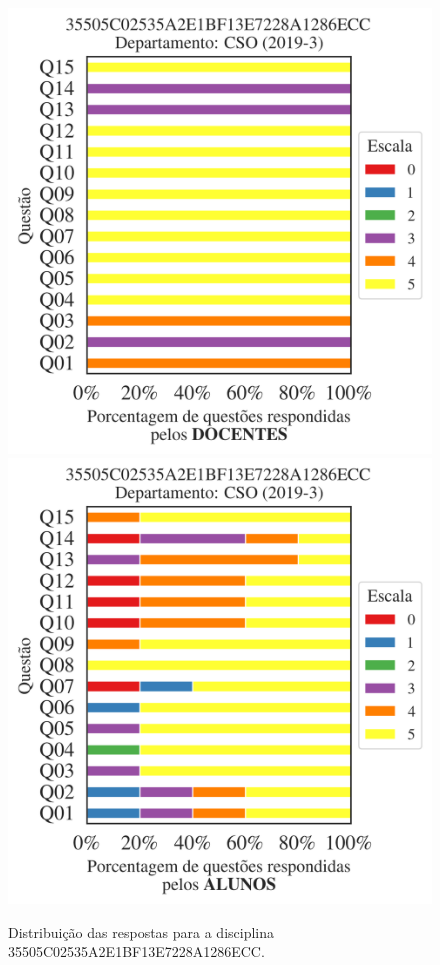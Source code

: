 \documentclass[a4paper,10pt]{article}
\begin{document}
\begin{figure}[h]
\centering
\includegraphics[width=0.485\linewidth]{analise_disciplina_departamento_CSO_35505C02535A2E1BF13E7228A1286ECC_docentes.png}
\includegraphics[width=0.485\linewidth]{analise_disciplina_departamento_CSO_35505C02535A2E1BF13E7228A1286ECC_alunos.png}
\caption{\label{fig:analise_geral_departamento}                Distribuição das respostas para a disciplina 35505C02535A2E1BF13E7228A1286ECC. }
\end{figure}
\end{document}
